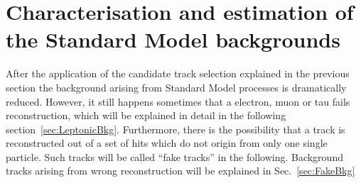\section{Characterisation and estimation of the Standard Model backgrounds}
\label{sec:BackgroundEstimation}
After the application of the candidate track selection explained in the previous section the background arising from Standard Model processes is dramatically reduced.
However, it still happens sometimes that a electron, muon or tau fails reconstruction, which will be explained in detail in the following section~\ref{sec:LeptonicBkg}.
Furthermore, there is the possibility that a track is reconstructed out of a set of hits which do not origin from only one single particle.
Such tracks will be called ``fake tracks'' in the following. 
Background tracks arising from wrong reconstruction will be explained in Sec.~\ref{sec:FakeBkg}

